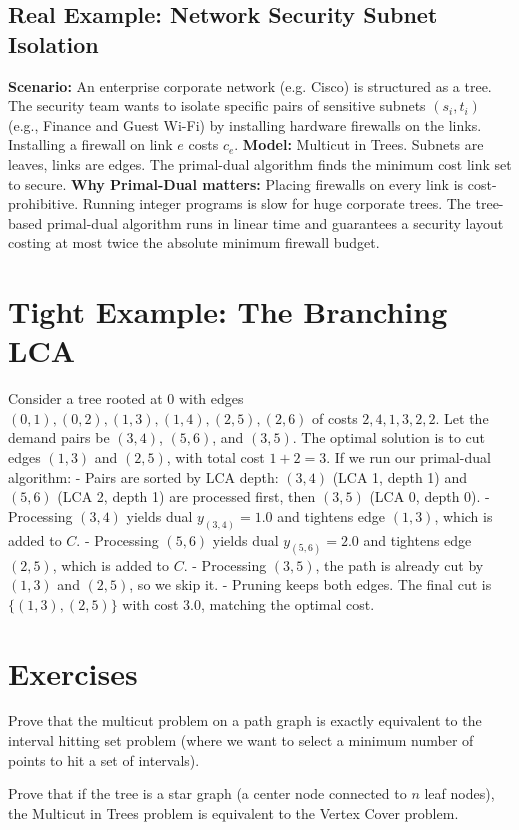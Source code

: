 \subsection*{Real Example: Network Security Subnet Isolation}
\textbf{Scenario:} An enterprise corporate network (e.g. Cisco) is structured as a tree. The security team wants to isolate specific pairs of sensitive subnets $(s_i, t_i)$ (e.g., Finance and Guest Wi-Fi) by installing hardware firewalls on the links. Installing a firewall on link $e$ costs $c_e$.
\textbf{Model:} Multicut in Trees. Subnets are leaves, links are edges. The primal-dual algorithm finds the minimum cost link set to secure.
\textbf{Why Primal-Dual matters:} Placing firewalls on every link is cost-prohibitive. Running integer programs is slow for huge corporate trees. The tree-based primal-dual algorithm runs in linear time and guarantees a security layout costing at most twice the absolute minimum firewall budget.

\section{Tight Example: The Branching LCA}
Consider a tree rooted at 0 with edges $(0, 1), (0, 2), (1, 3), (1, 4), (2, 5), (2, 6)$ of costs $2, 4, 1, 3, 2, 2$. Let the demand pairs be $(3, 4)$, $(5, 6)$, and $(3, 5)$.
The optimal solution is to cut edges $(1, 3)$ and $(2, 5)$, with total cost $1 + 2 = 3$.
If we run our primal-dual algorithm:
- Pairs are sorted by LCA depth: $(3, 4)$ (LCA 1, depth 1) and $(5, 6)$ (LCA 2, depth 1) are processed first, then $(3, 5)$ (LCA 0, depth 0).
- Processing $(3, 4)$ yields dual $y_{(3,4)} = 1.0$ and tightens edge $(1, 3)$, which is added to $C$.
- Processing $(5, 6)$ yields dual $y_{(5,6)} = 2.0$ and tightens edge $(2, 5)$, which is added to $C$.
- Processing $(3, 5)$, the path is already cut by $(1, 3)$ and $(2, 5)$, so we skip it.
- Pruning keeps both edges. The final cut is $\{(1, 3), (2, 5)\}$ with cost 3.0, matching the optimal cost.

\section{Exercises}
\begin{exercise}
Prove that the multicut problem on a path graph is exactly equivalent to the interval hitting set problem (where we want to select a minimum number of points to hit a set of intervals).
\end{exercise}
\begin{exercise}
Prove that if the tree is a star graph (a center node connected to $n$ leaf nodes), the Multicut in Trees problem is equivalent to the Vertex Cover problem.
\end{exercise}

